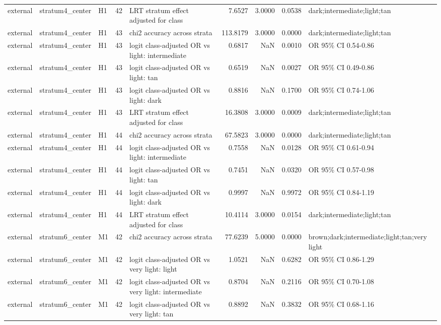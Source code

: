 \begin{tabular}{lllrlrrrl}
external & stratum4\_center & H1 & 42 & LRT stratum effect adjusted for class & 7.6527 & 3.0000 & 0.0538 & dark;intermediate;light;tan \\
external & stratum4\_center & H1 & 43 & chi2 accuracy across strata & 113.8179 & 3.0000 & 0.0000 & dark;intermediate;light;tan \\
external & stratum4\_center & H1 & 43 & logit class-adjusted OR vs light: intermediate & 0.6817 & NaN & 0.0010 & OR 95\% CI 0.54-0.86 \\
external & stratum4\_center & H1 & 43 & logit class-adjusted OR vs light: tan & 0.6519 & NaN & 0.0027 & OR 95\% CI 0.49-0.86 \\
external & stratum4\_center & H1 & 43 & logit class-adjusted OR vs light: dark & 0.8816 & NaN & 0.1700 & OR 95\% CI 0.74-1.06 \\
external & stratum4\_center & H1 & 43 & LRT stratum effect adjusted for class & 16.3808 & 3.0000 & 0.0009 & dark;intermediate;light;tan \\
external & stratum4\_center & H1 & 44 & chi2 accuracy across strata & 67.5823 & 3.0000 & 0.0000 & dark;intermediate;light;tan \\
external & stratum4\_center & H1 & 44 & logit class-adjusted OR vs light: intermediate & 0.7558 & NaN & 0.0128 & OR 95\% CI 0.61-0.94 \\
external & stratum4\_center & H1 & 44 & logit class-adjusted OR vs light: tan & 0.7451 & NaN & 0.0320 & OR 95\% CI 0.57-0.98 \\
external & stratum4\_center & H1 & 44 & logit class-adjusted OR vs light: dark & 0.9997 & NaN & 0.9972 & OR 95\% CI 0.84-1.19 \\
external & stratum4\_center & H1 & 44 & LRT stratum effect adjusted for class & 10.4114 & 3.0000 & 0.0154 & dark;intermediate;light;tan \\
external & stratum6\_center & M1 & 42 & chi2 accuracy across strata & 77.6239 & 5.0000 & 0.0000 & brown;dark;intermediate;light;tan;very light \\
external & stratum6\_center & M1 & 42 & logit class-adjusted OR vs very light: light & 1.0521 & NaN & 0.6282 & OR 95\% CI 0.86-1.29 \\
external & stratum6\_center & M1 & 42 & logit class-adjusted OR vs very light: intermediate & 0.8704 & NaN & 0.2116 & OR 95\% CI 0.70-1.08 \\
external & stratum6\_center & M1 & 42 & logit class-adjusted OR vs very light: tan & 0.8892 & NaN & 0.3832 & OR 95\% CI 0.68-1.16 \\

\end{tabular}
